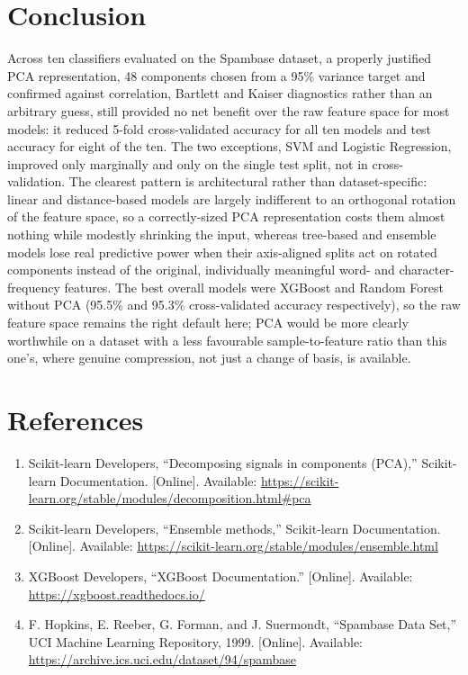\documentclass[12pt,a4paper]{article}
\begin{document}
\section{Conclusion}
Across ten classifiers evaluated on the Spambase dataset, a properly justified PCA
representation, 48 components chosen from a 95\% variance target and confirmed against
correlation, Bartlett and Kaiser diagnostics rather than an arbitrary guess, still provided no
net benefit over the raw feature space for most models: it reduced 5-fold cross-validated
accuracy for all ten models and test accuracy for eight of the ten. The two exceptions, SVM
and Logistic Regression, improved only marginally and only on the single test split, not in
cross-validation. The clearest pattern is architectural rather than dataset-specific: linear
and distance-based models are largely indifferent to an orthogonal rotation of the feature
space, so a correctly-sized PCA representation costs them almost nothing while modestly
shrinking the input, whereas tree-based and ensemble models lose real predictive power when
their axis-aligned splits act on rotated components instead of the original, individually
meaningful word- and character-frequency features. The best overall models were XGBoost and
Random Forest without PCA (95.5\% and 95.3\% cross-validated accuracy respectively), so the
raw feature space remains the right default here; PCA would be more clearly worthwhile on a
dataset with a less favourable sample-to-feature ratio than this one's, where genuine
compression, not just a change of basis, is available.

\section{References}
\begin{enumerate}
\item Scikit-learn Developers, ``Decomposing signals in components (PCA),'' Scikit-learn
Documentation. [Online]. Available:
\url{https://scikit-learn.org/stable/modules/decomposition.html\#pca}
\item Scikit-learn Developers, ``Ensemble methods,'' Scikit-learn Documentation. [Online].
Available: \url{https://scikit-learn.org/stable/modules/ensemble.html}
\item XGBoost Developers, ``XGBoost Documentation.'' [Online]. Available:
\url{https://xgboost.readthedocs.io/}
\item F. Hopkins, E. Reeber, G. Forman, and J. Suermondt, ``Spambase Data Set,'' UCI Machine
Learning Repository, 1999. [Online]. Available:
\url{https://archive.ics.uci.edu/dataset/94/spambase}
\end{enumerate}
\end{document}

